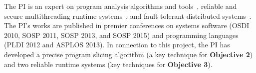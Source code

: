 The PI is an expert on program analysis algorithms and 
tools~\cite{wu:pldi12, woodpecker:asplos13, repframe:apsys15}, reliable and 
secure multithreading runtime systems~\cite{smt:cacm, cui:tern:osdi10, 
peregrine:sosp11, parrot:sosp13}, and fault-tolerant distributed 
systems~\cite{crane:sosp15}. The PI's works are published in 
premier conferences on systems software (OSDI 2010, SOSP 2011, SOSP 2013, and 
SOSP 2015) and programming languages (PLDI 2012 and ASPLOS 2013). In connection 
to this project, the PI has developed a precise program slicing algorithm (a 
key technique for \textbf{Objective 2}) and two reliable runtime systems (key 
techniques for \textbf{Objective 3}).




